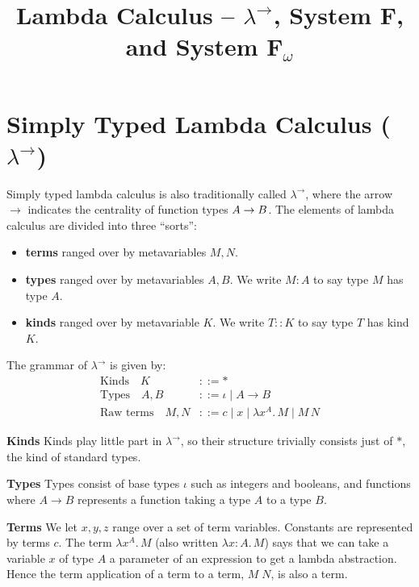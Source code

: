 \documentclass[acmsmall, 9pt]{article}
\begin{document}
\pagestyle{empty} 
 
\title{Lambda Calculus -- $\lambda^{\rightarrow}$, System F, and System F$_\omega$ }
 
\maketitle
 
\section{Simply Typed Lambda Calculus ($\lambda^{\rightarrow}$)}
Simply typed lambda calculus \cite{cambridge-lambda-calc} is also traditionally called $\lambda^{\rightarrow}$, where the arrow $\rightarrow$ indicates the centrality of function types ${A}\rightarrow{B}$. The elements of lambda calculus are divided into three ``sorts'':
\begin{itemize}
  \item \textbf{terms} ranged over by metavariables $M, N$.
  \item \textbf{types} ranged over by metavariables $A, B$. We write $M: A$ to say type $M$ has type $A$.
  \item \textbf{kinds} ranged over by metavariable $K$. We write $T :: K$ to say type $T$ has kind $K$.
\end{itemize}
\noindent
The grammar of $\lambda^{\rightarrow}$ is given by:
\begin{align*}
  \text{Kinds} \quad K &::= * \\
  \text{Types} \quad  A, B &::= \iota \; | \;  A \rightarrow B  \\
  \text{Raw terms} \quad M, N &::= c \; | \; x \; | \;  \lambda x^A . \, M \; | \; M \, N
\end{align*}

\textbf{Kinds} Kinds play little part in $\lambda^{\rightarrow}$, so their structure trivially consists just of $*$, the kind of standard types.

\textbf{Types} Types consist of base types $\iota$ such as integers and booleans, and functions where $A \rightarrow B$ represents a function taking a type $A$ to a type $B$.

\textbf{Terms} We let $x, y, z$ range over a set of term variables. Constants are represented by terms $c$. The term $\lambda x^A . \, M$ (also written $\lambda x : A . \, M$) says that we can take a variable $x$ of type $A$ a parameter of an expression to get a lambda abstraction. Hence the term application of a term to a term, $M \; N$, is also a term.
\end{document}
